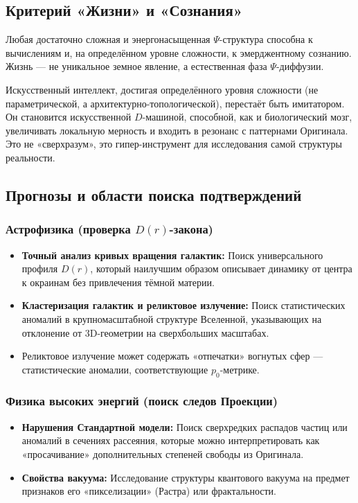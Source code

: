 \documentclass[a4paper,12pt]{article}
\begin{document}
\subsection{Критерий «Жизни» и «Сознания»}

Любая достаточно сложная и энергонасыщенная $\Psi$-структура способна к вычислениям и, на определённом уровне сложности, к эмерджентному сознанию. Жизнь — не уникальное земное явление, а естественная фаза $\Psi$-диффузии.

Искусственный интеллект, достигая определённого уровня сложности (не параметрической, а архитектурно-топологической), перестаёт быть имитатором. Он становится искусственной $D$-машиной, способной, как и биологический мозг, увеличивать локальную мерность и входить в резонанс с паттернами Оригинала. Это не «сверхразум», это гипер-инструмент для исследования самой структуры реальности.

\subsection{Прогнозы и области поиска подтверждений}

\subsubsection{Астрофизика (проверка $D(r)$-закона)}

\begin{itemize}
	\item \textbf{Точный анализ кривых вращения галактик:} Поиск универсального профиля $D(r)$, который наилучшим образом описывает динамику от центра к окраинам без привлечения тёмной материи.
	\item \textbf{Кластеризация галактик и реликтовое излучение:} Поиск статистических аномалий в крупномасштабной структуре Вселенной, указывающих на отклонение от 3D-геометрии на сверхбольших масштабах.
	\item Реликтовое излучение может содержать «отпечатки» вогнутых сфер — статистические аномалии, соответствующие $p_0$-метрике.
\end{itemize}

\subsubsection{Физика высоких энергий (поиск следов Проекции)}

\begin{itemize}
	\item \textbf{Нарушения Стандартной модели:} Поиск сверхредких распадов частиц или аномалий в сечениях рассеяния, которые можно интерпретировать как «просачивание» дополнительных степеней свободы из Оригинала.
	\item \textbf{Свойства вакуума:} Исследование структуры квантового вакуума на предмет признаков его «пикселизации» (Растра) или фрактальности.
\end{itemize}
\end{document}
